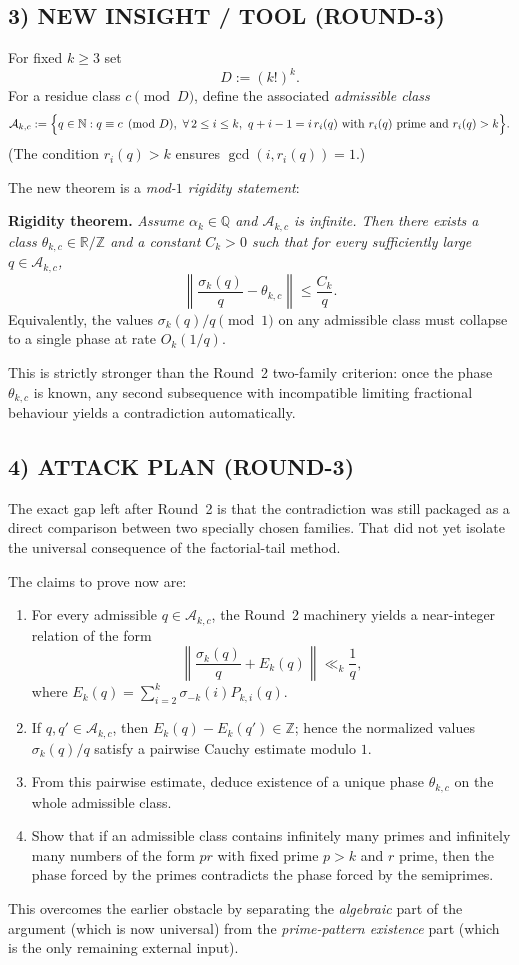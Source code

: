 \subsection*{3) NEW INSIGHT / TOOL (ROUND-3)}
For fixed $k\ge 3$ set
\[
D:=(k!)^k.
\]
For a residue class $c\pmod D$, define the associated \emph{admissible class}
\[
\mathcal{A}_{k,c}:=\Bigl\{q\in\mathbb{N}: q\equiv c\pmod D,\ \forall\,2\le i\le k,\ q+i-1=i\,r_i(q)
\text{ with }r_i(q)\text{ prime and }r_i(q)>k\Bigr\}.
\]
(The condition $r_i(q)>k$ ensures $\gcd(i,r_i(q))=1$.)

The new theorem is a \emph{mod-$1$ rigidity statement}:

\medskip
\noindent
\textbf{Rigidity theorem.} \emph{Assume $\alpha_k\in\mathbb{Q}$ and $\mathcal{A}_{k,c}$ is infinite. Then there exists a class $\theta_{k,c}\in\mathbb{R}/\mathbb{Z}$ and a constant $C_k>0$ such that for every sufficiently large $q\in\mathcal{A}_{k,c}$,}
\[
\left\|\frac{\sigma_k(q)}{q}-\theta_{k,c}\right\|\le \frac{C_k}{q}.
\]
Equivalently, the values $\sigma_k(q)/q\pmod 1$ on any admissible class must collapse to a single phase at rate $O_k(1/q)$.

This is strictly stronger than the Round~2 two-family criterion: once the phase $\theta_{k,c}$ is known, any second subsequence with incompatible limiting fractional behaviour yields a contradiction automatically.

\subsection*{4) ATTACK PLAN (ROUND-3)}
The exact gap left after Round~2 is that the contradiction was still packaged as a direct comparison between two specially chosen families. That did not yet isolate the universal consequence of the factorial-tail method.

The claims to prove now are:
\begin{enumerate}
\item For every admissible $q\in\mathcal{A}_{k,c}$, the Round~2 machinery yields a near-integer relation of the form
\[
\left\|\frac{\sigma_k(q)}{q}+E_k(q)\right\|\ll_k \frac1q,
\]
where $E_k(q)=\sum_{i=2}^k\sigma_{-k}(i)P_{k,i}(q)$.
\item If $q,q'\in\mathcal{A}_{k,c}$, then $E_k(q)-E_k(q')\in\mathbb{Z}$; hence the normalized values $\sigma_k(q)/q$ satisfy a pairwise Cauchy estimate modulo $1$.
\item From this pairwise estimate, deduce existence of a unique phase $\theta_{k,c}$ on the whole admissible class.
\item Show that if an admissible class contains infinitely many primes and infinitely many numbers of the form $pr$ with fixed prime $p>k$ and $r$ prime, then the phase forced by the primes contradicts the phase forced by the semiprimes.
\end{enumerate}
This overcomes the earlier obstacle by separating the \emph{algebraic} part of the argument (which is now universal) from the \emph{prime-pattern existence} part (which is the only remaining external input).

